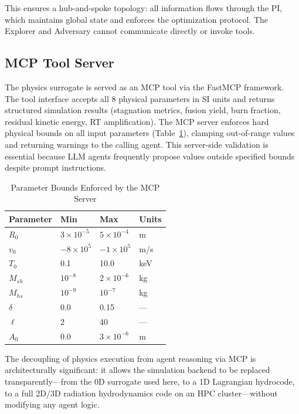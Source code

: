 \documentclass[conference]{IEEEtran}
\begin{document}
This ensures a hub-and-spoke topology: all information flows through the PI, which maintains global state and enforces the optimization protocol.  The Explorer and Adversary cannot communicate directly or invoke tools.

\subsection{MCP Tool Server}

The physics surrogate is served as an MCP tool via the FastMCP framework.  The tool interface accepts all 8 physical parameters in SI units and returns structured simulation results (stagnation metrics, fusion yield, burn fraction, residual kinetic energy, RT amplification).  The MCP server enforces hard physical bounds on all input parameters (Table~\ref{tab:bounds}), clamping out-of-range values and returning warnings to the calling agent.  This server-side validation is essential because LLM agents frequently propose values outside specified bounds despite prompt instructions.

\begin{table}[htbp]
\caption{Parameter Bounds Enforced by the MCP Server}
\label{tab:bounds}
\centering
\begin{tabular}{llll}
\toprule
\textbf{Parameter} & \textbf{Min} & \textbf{Max} & \textbf{Units} \\
\midrule
$R_0$ & $3 \times 10^{-5}$ & $5 \times 10^{-4}$ & m \\
$v_0$ & $-8 \times 10^{5}$ & $-1 \times 10^{5}$ & m/s \\
$T_0$ & 0.1 & 10.0 & keV \\
$M_{sh}$ & $10^{-8}$ & $2 \times 10^{-6}$ & kg \\
$M_{hs}$ & $10^{-9}$ & $10^{-7}$ & kg \\
$\delta$ & 0.0 & 0.15 & --- \\
$\ell$ & 2 & 40 & --- \\
$A_0$ & 0.0 & $3 \times 10^{-6}$ & m \\
\bottomrule
\end{tabular}
\end{table}

The decoupling of physics execution from agent reasoning via MCP is architecturally significant: it allows the simulation backend to be replaced transparently---from the 0D surrogate used here, to a 1D Lagrangian hydrocode, to a full 2D/3D radiation hydrodynamics code on an HPC cluster---without modifying any agent logic.
\end{document}
